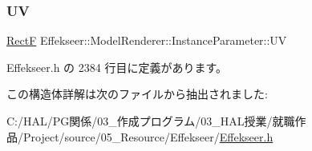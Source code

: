 \subsubsection{\texorpdfstring{UV}{UV}}
{\footnotesize\ttfamily \mbox{\hyperlink{struct_effekseer_1_1_rect_f}{RectF}} Effekseer\+::\+Model\+Renderer\+::\+Instance\+Parameter\+::\+UV}



 Effekseer.\+h の 2384 行目に定義があります。



この構造体詳解は次のファイルから抽出されました\+:\begin{DoxyCompactItemize}
\item 
C\+:/\+H\+A\+L/\+P\+G関係/03\+\_\+作成プログラム/03\+\_\+\+H\+A\+L授業/就職作品/\+Project/source/05\+\_\+\+Resource/\+Effekseer/\mbox{\hyperlink{_effekseer_8h}{Effekseer.\+h}}\end{DoxyCompactItemize}
